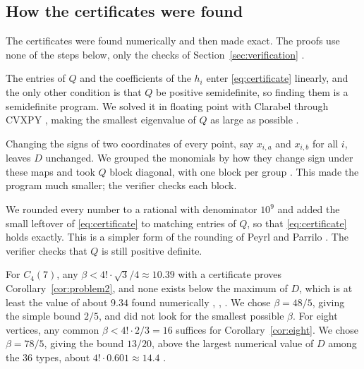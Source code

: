 \subsection{How the certificates were found}

\begin{remark}
  The certificates were found numerically and then made exact. The proofs use
  none of the steps below, only the checks of
  Section~\ref{sec:verification} .
\end{remark}

\begin{remark}
  \label{rem:computation}
  The entries of $Q$ and the coefficients of the $h_{i}$ enter
  \eqref{eq:certificate} linearly, and the only other condition is that $Q$
  be positive semidefinite, so finding them is a semidefinite program. We
  solved it in floating point with Clarabel \cite{goulart-chen-2026} through
  CVXPY \cite{diamond-boyd-2016}, making the smallest eigenvalue of $Q$ as
  large as possible .
\end{remark}

\begin{remark}
  Changing the signs of two coordinates of every point, say $x_{i,a}$ and
  $x_{i,b}$ for all $i$, leaves $D$ unchanged. We grouped the monomials by how
  they change sign under these maps and took $Q$ block diagonal, with one
  block per group . This made the program much smaller; the
  verifier checks each block.
\end{remark}

\begin{remark}
  We rounded every number to a rational with denominator $10^{9}$ and added
  the small leftover of \eqref{eq:certificate} to matching entries of $Q$, so
  that \eqref{eq:certificate} holds exactly. This is a simpler form of the
  rounding of Peyrl and Parrilo \cite{peyrl-parrilo-2008} .
  The verifier checks that $Q$ is still positive definite.
\end{remark}

\begin{remark}
  For $C_{4}(7)$, any $\beta < 4! \cdot \sqrt{3}/4 \approx 10.39$ with a
  certificate proves Corollary~\ref{cor:problem2}, and none exists below the
  maximum of $D$, which is at least the value of about $9.34$ found
  numerically , , . We chose $\beta = 48/5$, giving the simple
  bound $2/5$, and did not look for the smallest possible $\beta$. For eight
  vertices, any common $\beta < 4! \cdot 2/3 = 16$ suffices for
  Corollary~\ref{cor:eight}. We chose $\beta = 78/5$, giving the bound
  $13/20$, above the largest numerical value of $D$ among the $36$ types,
  about $4! \cdot 0.601 \approx 14.4$ .
\end{remark}
